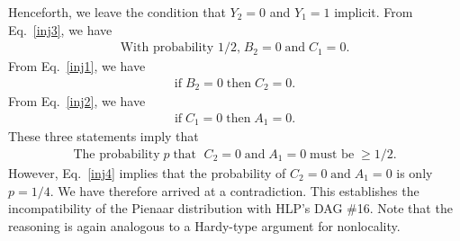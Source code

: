 \documentclass[aps,english,10pt,superscriptaddress,onecolumn,twoside,longbibliography,pra,floatfix,fleqn,nofootinbib]{revtex4-1}%
\theoremstyle{definition}
\begin{document}
Henceforth, we leave the condition that $Y_2=0$ and $Y_1=1$ implicit.  
From Eq.~\eqref{inj3}, we have 
\begin{align}
\text{With probability 1/2,}\; B_2=0\; \text{and}\;C_1=0.
\end{align}
From Eq.~\eqref{inj1}, we have
\begin{align}
\text{if}\; B_2=0\; \text{then}\;C_2=0.
\end{align}
From Eq.~\eqref{inj2}, we have
\begin{align}
\text{if}\; C_1=0\; \text{then}\;A_1=0.
\end{align}
These three statements imply that 
\begin{align}
\text{The probability}\; p\; \text{that }\; C_2=0\; \text{and}\;A_1=0 \;\text{must be} \; \ge 1/2.
\end{align}
However, Eq.~\eqref{inj4} implies that the probability of $C_2=0\; \text{and}\;A_1=0$ is only $p=1/4$.  
We have therefore arrived at a contradiction.  This establishes the incompatibility of the Pienaar distribution with HLP's DAG \#16.  Note that the reasoning is again analogous to a Hardy-type argument for nonlocality. 
\end{document}
